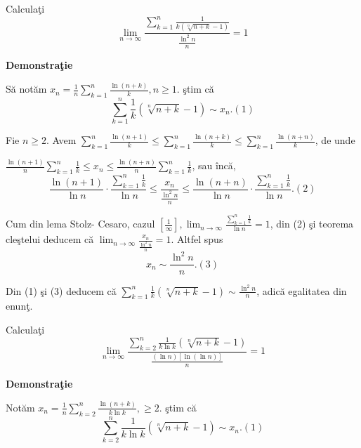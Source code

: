 \documentclass[a4paper,12pt,oneside]{report}
\begin{document}
Calcula\c ti 
\begin{displaymath}
  \lim_{n \to \infty }\frac{\sum_{k=1}^{n}\frac{1}{k\left ( \sqrt[n]{n+k}-1 \right )}}{\frac{\ln^{2}n}{n}} = 1
\end{displaymath}

\textbf{Demonstra\c tie} 

S\u a not\u am \(x_{n}= \frac{1}{n}\sum_{k=1}^{n}\frac{\ln\left ( n+k \right )}{k}, n\geq 1\). 
\c stim c\u a 
\begin{displaymath}
  \sum_{k=1}^{n}\frac{1}{k}\left ( \sqrt[n]{n+k}-1 \right )\sim x_{n}. (1)
\end{displaymath}

Fie \(n\geq 2\). Avem \(\sum_{k=1}^{n}\frac{\ln\left ( n+1 \right )}{k}\leq \sum_{k=1}^{n}\frac{\ln\left ( n+k \right )}{k}\leq \sum_{k=1}^{n}\frac{\ln\left ( n+n \right )}{k}\), de unde 

\(\frac{\ln \left ( n+1 \right )}{n}\sum_{k=1}^{n}\frac{1}{k}\leq x_{n}\leq \frac{\ln \left ( n+n \right )}{n}\sum_{k=1}^{n}\frac{1}{k}\), sau \^ inc\u a, 
\begin{displaymath}
  \frac{\ln \left ( n+1 \right )}{\ln n}\cdot \frac{\sum_{k=1}^{n}\frac{1}{k}}{\ln n}\leq \frac{x_{n}}{\frac{\ln^{2}n}{n}}\leq \frac{\ln \left ( n+n \right )}{\ln n}\cdot \frac{\sum_{k=1}^{n}\frac{1}{k}}{\ln n }. (2)
\end{displaymath}

Cum din lema Stolz- Cesaro, cazul \(\left [ \frac{1}{\infty } \right ], \lim_{n \to \infty }\frac{\sum_{k=1}^{n}\frac{1}{k}}{\ln n} = 1\), din (2) \c si teorema cle\c stelui deducem c\u a \(\lim_{n \to \infty }\frac{x_{n}}{\frac{\ln ^{2}n}{n}} = 1\). 
Altfel spus 
\begin{displaymath}
  x_{n}\sim \frac{\ln^{2}n}{n}. (3)
\end{displaymath}


Din (1) \c si (3) deducem c\u a \(\sum_{k=1}^{n}\frac{1}{k}\left ( \sqrt[n]{n+k}-1 \right )\sim \frac{\ln^{2}n}{n}\), adic\u a egalitatea din enun\c t. 

Calcula\c ti 
\begin{displaymath}
  \lim_{n \to \infty }\frac{\sum_{k=2}^{n}\frac{1}{k \ln k}\left ( \sqrt[n]{n+k}-1 \right )}{\frac{\left ( \ln n \right )\left [ \ln \left ( \ln n  \right ) \right ]}{n}} = 1
\end{displaymath}


\textbf{Demonstra\c tie}
 
Not\u am \(x_{n} = \frac{1}{n}\sum_{k=2}^{n}\frac{\ln \left ( n+k \right )}{k \ln k}, \geq 2.\)
\c stim c\u a 
\begin{displaymath}
  \sum_{k=2}^{n}\frac{1}{k\ln k}\left ( \sqrt[n]{n+k}-1 \right )\sim x_{n} . (1)
\end{displaymath}
\end{document}
